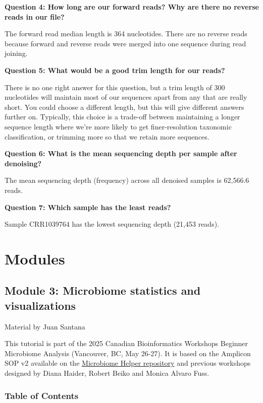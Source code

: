\documentclass[
]{book}
\begin{document}
\textbf{Question 4: How long are our forward reads? Why are there no reverse reads in our file?}

The forward read median length is 364 nucleotides. There are no reverse reads because forward and reverse reads were merged into one sequence during read joining.

\textbf{Question 5: What would be a good trim length for our reads?}

There is no one right answer for this question, but a trim length of 300 nucleotides will maintain most of our sequences apart from any that are really short. You could choose a different length, but this will give different answers further on. Typically, this choice is a trade-off between maintaining a longer sequence length where we're more likely to get finer-resolution taxonomic classification, or trimming more so that we retain more sequences.

\textbf{Question 6: What is the mean sequencing depth per sample after denoising?}

The mean sequencing depth (frequency) across all denoised samples is 62,566.6 reads.

\textbf{Question 7: Which sample has the least reads?}

Sample CRR1039764 has the lowest sequencing depth (21,453 reads).

\part{Modules}\label{part-modules-2}

\chapter{Module 3: Microbiome statistics and visualizations}\label{module-3-microbiome-statistics-and-visualizations}

Material by Juan Santana

This tutorial is part of the 2025 Canadian Bioinformatics Workshops Beginner Microbiome Analysis (Vancouver, BC, May 26-27). It is based on the Amplicon SOP v2 available on the \href{https://github.com/LangilleLab/microbiome_helper/wiki/Amplicon-SOP-v2-(qiime2-2022.11)}{Microbiome Helper repository} and previous workshops designed by Diana Haider, Robert Beiko and Monica Alvaro Fuss.

\section{Table of Contents}\label{table-of-contents}
\end{document}
